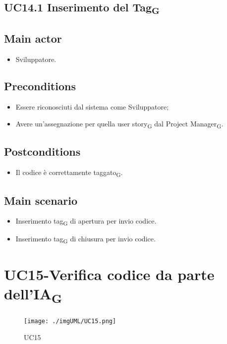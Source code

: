 \documentclass{article}
\begin{document}
        \subsection{UC14.1 Inserimento del Tag\textsubscript{G}}
\subsection*{Main actor}
        \begin{itemize}
            \item Sviluppatore.
        \end{itemize}
    
    \subsection*{Preconditions}
        \begin{itemize}
            \item Essere riconosciuti dal sistema come Sviluppatore;
            \item Avere un'assegnazione per quella user story\textsubscript{G} dal Project Manager\textsubscript{G}.
        \end{itemize}
        
    \subsection*{Postconditions} 
        \begin{itemize}
            \item Il codice è correttamente taggato\textsubscript{G}.
        \end{itemize}

    \subsection*{Main scenario}
        \begin{itemize}
            \item Inserimento tag\textsubscript{G} di apertura per invio codice.
            \item Inserimento tag\textsubscript{G} di chiusura per invio codice.
        \end{itemize}

        
        
\section{UC15-Verifica codice da parte dell'IA\textsubscript{G}}
    \begin{figure}[h]
      \centering
      \texttt{[image: ./imgUML/UC15.png]}
        \caption{UC15}
      \label{fig:UC15}
    \end{figure}
    
\end{document}
